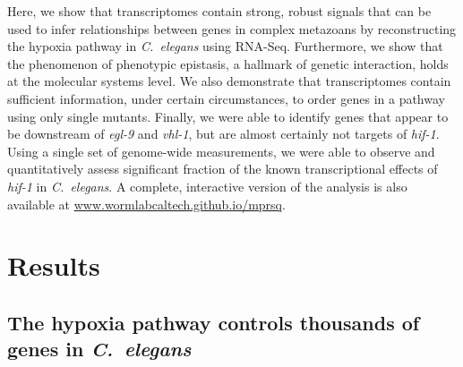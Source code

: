 \documentclass[9pt,twocolumn,twoside]{pnas-new}
\newcommand{\cel}{\emph{C.~elegans}}
\newcommand{\egl}{\emph{egl-9}}
\newcommand{\rhy}{\emph{rhy-1}}
\newcommand{\vhl}{\emph{vhl-1}}
\newcommand{\hif}{\emph{hif-1}}
\newcommand{\eglp}{EGL-9}
\newcommand{\rhyp}{RHY-1}
\newcommand{\vhlp}{VHL-1}
\newcommand{\hifp}{HIF-1}
\begin{document}

Here, we show that transcriptomes contain strong, robust signals that can be
used to infer relationships between genes in complex metazoans by reconstructing
the hypoxia pathway in \cel{} using RNA-Seq.
Furthermore, we show that the phenomenon of phenotypic epistasis, a hallmark of
genetic interaction, holds at the molecular systems level.
We also demonstrate that transcriptomes contain sufficient information, under
certain circumstances, to order genes in a pathway using only single mutants.
Finally, we were able to identify genes that appear to be downstream of \egl{}
and \vhl{}, but are almost certainly not targets of \hif{}.
Using a single set of genome-wide measurements, we were able to observe and
quantitatively assess  significant fraction of the known transcriptional
effects of \hif{} in \cel{}.
A complete, interactive version of the analysis is also available at
\url{www.wormlabcaltech.github.io/mprsq}.

\section*{Results}
\subsection*{The hypoxia pathway controls thousands of genes in \cel{}}
\label{sub:summary}
\end{document}
